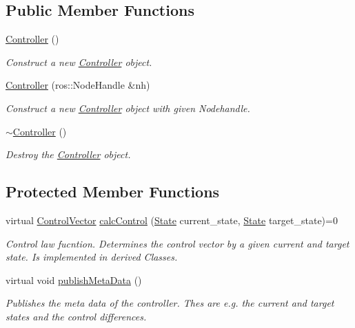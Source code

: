 \subsection*{Public Member Functions}
\begin{DoxyCompactItemize}
\item 
\mbox{\label{classController_a95c56822d667e94b031451729ce069a9}} 
\hyperlink{classController_a95c56822d667e94b031451729ce069a9}{Controller} ()
\begin{DoxyCompactList}\small\item\em Construct a new \hyperlink{classController}{Controller} object. \end{DoxyCompactList}\item 
\hyperlink{classController_a7341f9092e1977cdd2a1492c4422c019}{Controller} (ros\+::\+Node\+Handle \&nh)
\begin{DoxyCompactList}\small\item\em Construct a new \hyperlink{classController}{Controller} object with given Nodehandle. \end{DoxyCompactList}\item 
\mbox{\label{classController_a0ab87934c4f7a266cfdb86e0f36bc1b5}} 
\hyperlink{classController_a0ab87934c4f7a266cfdb86e0f36bc1b5}{$\sim$\+Controller} ()
\begin{DoxyCompactList}\small\item\em Destroy the \hyperlink{classController}{Controller} object. \end{DoxyCompactList}\end{DoxyCompactItemize}
\subsection*{Protected Member Functions}
\begin{DoxyCompactItemize}
\item 
virtual \hyperlink{structController_1_1ControlVector}{Control\+Vector} \hyperlink{classController_a190a3955517e39310a4b715a883cbe02}{calc\+Control} (\hyperlink{structController_1_1State}{State} current\+\_\+state, \hyperlink{structController_1_1State}{State} target\+\_\+state)=0
\begin{DoxyCompactList}\small\item\em Control law fucntion. Determines the control vector by a given current and target state. Is implemented in derived Classes. \end{DoxyCompactList}\item 
\mbox{\label{classController_a95ac558f7a8d570ba4f0ba12182de8c5}} 
virtual void \hyperlink{classController_a95ac558f7a8d570ba4f0ba12182de8c5}{publish\+Meta\+Data} ()
\begin{DoxyCompactList}\small\item\em Publishes the meta data of the controller. Thes are e.\+g. the current and target states and the control differences. \end{DoxyCompactList}\end{DoxyCompactItemize}
